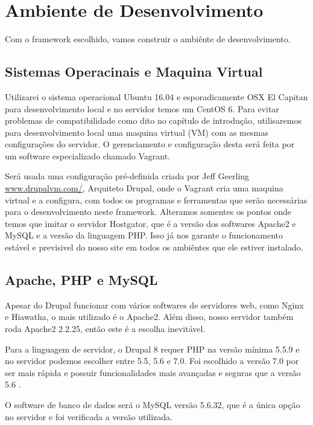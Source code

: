 \section{Ambiente de Desenvolvimento}

Com o framework escolhido, vamos construir o ambiênte de desenvolvimento. 

\subsection{Sistemas Operacinais e Maquina Virtual} 
Utilizarei o sistema operacional Ubuntu 16.04 e esporadicamente OSX El Capitan para desenvolvimento local e no servidor temos um CentOS 6. Para evitar problemas de compatibilidade como dito no capítulo de introdução, utilisaremos para desenvolvimento local uma maquina virtual (VM) com as mesmas configurações do servidor. O gerenciamento e configuração desta será feita por um software especializado chamado Vagrant.

Será usada uma configuração pré-definida criada por Jeff Geerling \url{www.drupalvm.com/}, Arquiteto Drupal, onde o Vagrant cria uma maquina virtual e a configura, com todos os programas e ferramentas que serão necessárias para o desenvolvimento neste framework. Alteramos somentes os pontos onde temos que imitar o servidor Hostgator, que é a versão dos softwares Apache2 e MySQL e a versão da linguagem PHP. Isso já nos garante o funcionamento estável e previsivel do nosso site em todos os ambiêntes que ele estiver instalado.

\subsection{Apache, PHP e MySQL}
Apesar do Drupal funcionar com vários softwares de servidores web, como Nginx e Hiawatha, o mais utilizado é o Apache2. Além disso, nosso servidor também roda Apache2 2.2.25, então este é a escolha inevitável. 

Para a linguagem de servidor, o Drupal 8 requer PHP na versão mínima 5.5.9 e no servidor podemos escolher entre 5.5, 5.6 e 7.0. Foi escolhido a versão 7.0 por ser mais rápida \cite{PHP7Velocidade} e possuir funcionalidades mais avançadas e seguras que a versão 5.6 \cite{PHP7}.

O software de banco de dados será o MySQL versão 5.6.32, que é a única opção no servidor e foi verificada a versão utilizada.

